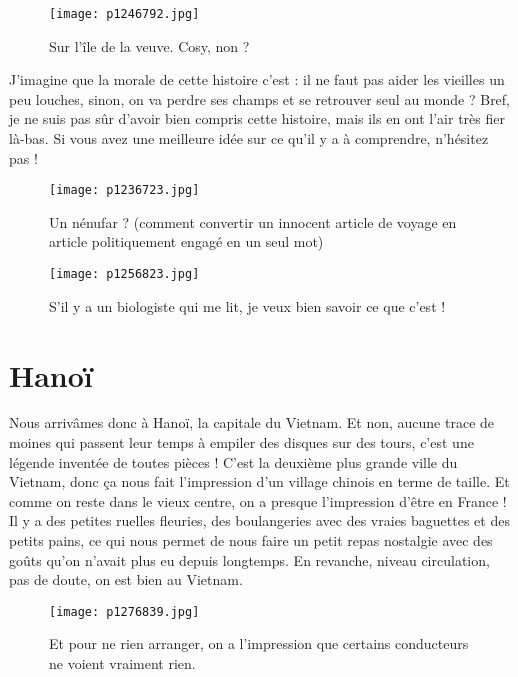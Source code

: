 \documentclass{book}
\begin{document}
\begin{figure}[h]
\centering
\texttt{[image: p1246792.jpg]}
\caption*{Sur l'île de la veuve. Cosy, non ?}
\end{figure}

J'imagine que la morale de cette histoire c'est : il ne faut pas aider les vieilles un peu louches, sinon, on va perdre ses champs et se retrouver seul au monde ? Bref, je ne suis pas sûr d'avoir bien compris cette histoire, mais ils en ont l'air très fier là-bas. Si vous avez une meilleure idée sur ce qu'il y a à comprendre, n'hésitez pas !


\begin{figure}[h]
\centering
\texttt{[image: p1236723.jpg]}
\caption*{Un nénufar ? (comment convertir un innocent article de voyage en article politiquement engagé en un seul mot)}
\end{figure}


\begin{figure}[h]
\centering
\texttt{[image: p1256823.jpg]}
\caption*{S'il y a un biologiste qui me lit, je veux bien savoir ce que c'est !}
\end{figure}



\chapter{Hanoï}
Nous arrivâmes donc à Hanoï, la capitale du Vietnam. Et non, aucune trace de moines qui passent leur temps à empiler des disques sur des tours, c'est une légende inventée de toutes pièces ! C'est la deuxième plus grande ville du Vietnam, donc ça nous fait l'impression d'un village chinois en terme de taille. Et comme on reste dans le vieux centre, on a presque l'impression d'être en France ! Il y a des petites ruelles fleuries, des boulangeries avec des vraies baguettes et des petits pains, ce qui nous permet de nous faire un petit repas nostalgie avec des goûts qu'on n'avait plus eu depuis longtemps. En revanche, niveau circulation, pas de doute, on est bien au Vietnam.


\begin{figure}[h]
\centering
\texttt{[image: p1276839.jpg]}
\caption*{Et pour ne rien arranger, on a l'impression que certains conducteurs ne voient vraiment rien.}
\end{figure}
\end{document}
